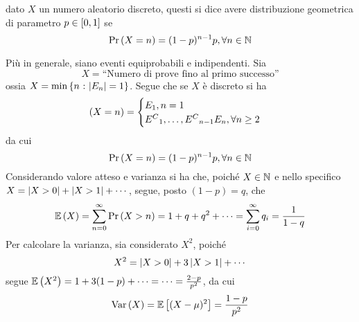 \documentclass{subfiles}
\begin{document}
\begin{Definition*}
    dato $X$ un numero aleatorio discreto, questi si dice avere distribuzione geometrica di parametro $p \in \Range*{0}{1}$ se
    $$
        \Prob{X = n} = (1 - p)^{n - 1} p, \forall n \in \Natural
    $$
\end{Definition*}
Più in generale, siano  eventi equiprobabili e indipendenti. Sia
$$
    X = \text{``Numero di prove fino al primo successo''}
$$
ossia $X = \Min{n}[\Abs{E_{n}} = 1]$. Segue che se $X$ è discreto si ha
$$
    (X = n) = \begin{cases}
        E_{1}, n = 1 \\
        {{E^{C}}}_{1}, \ldots, {{E^{C}}}_{n - 1}E_{n}, \forall n \ge 2
    \end{cases}
$$
da cui
$$
    \Prob{X = n} =(1 - p)^{n - 1}p, \forall n \in \Natural
$$
Considerando valore atteso e varianza si ha che, poiché $X \in \operatorname{\mathbb{N}}$ e nello specifico $X = \left\vert {X > 0} \right\vert + \left\vert {X > 1} \right\vert + \cdots$,
segue, posto $(1 - p) = q$, che
$$
    \Expected{X} = \Sum{\Prob{X > n}}{n = 0}[\infty]  = 1 + q + q^{2} + \cdots = \Sum{q_{i}}{i = 0}[\infty] = \Frac{1}{1 - q}
$$
Per calcolare la varianza, sia considerato $X^{2}$, poiché
$$
    X^{2} = \left\vert {X > 0} \right\vert + 3 \left\vert {X > 1} \right\vert + \cdots
$$
segue $\Expected{X^{2}} = 1 + 3(1 - p) + \cdots = \cdots = \tfrac{2 - p}{p^{2}}$, da cui
$$
    \Var{X} = \Expected*{(X - \mu)^{2}} = \Frac{1 - p}{p^{2}}
$$
\end{document}
